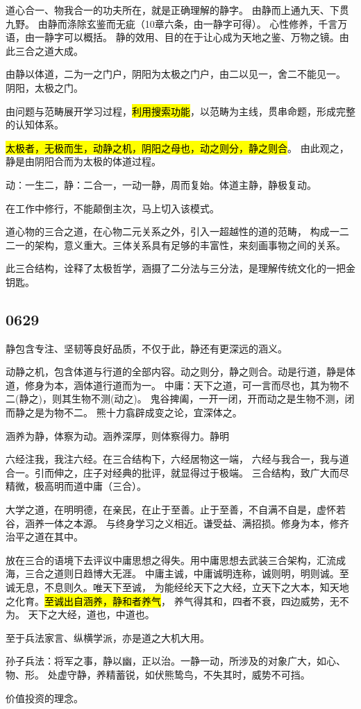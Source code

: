 道心合一、物我合一的功夫所在，就是正确理解的静字。
由静而上通九天、下贯九野。
由静而涤除玄鉴而无疵（10章六条，由一静字可得）。
心性修养，千言万语，由一静字可以概括。
静的效用、目的在于让心成为天地之鉴、万物之镜。由此三合之道大成。

由静以体道，二为一之门户，阴阳为太极之门户，由二以见一，舍二不能见一。
阴阳，太极之门。


由问题与范畴展开学习过程，\hl{利用搜索功能}，以范畴为主线，贯串命题，形成完整的认知体系。

\hl{太极者，无极而生，动静之机，阴阳之母也，动之则分，静之则合}。
由此观之，静是由阴阳合而为太极的体道过程。

动：一生二，静：二合一，一动一静，周而复始。体道主静，静极复动。

在工作中修行，不能颠倒主次，马上切入该模式。

道心物的三合之道，在心物二元关系之外，引入一超越性的道的范畴，
构成一二二一的架构，意义重大。三体关系具有足够的丰富性，来刻画事物之间的关系。

此三合结构，诠释了太极哲学，涵摄了二分法与三分法，是理解传统文化的一把金钥匙。

\subsection{0629}

静包含专注、坚韧等良好品质，不仅于此，静还有更深远的涵义。

动静之机，包含体道与行道的全部内容。动之则分，静之则合。动是行道，静是体道，修身为本，涵体道行道而为一。
中庸：天下之道，可一言而尽也，其为物不二(静之)，则其生物不测(动之)。
鬼谷捭阖，一开一闭，开而动之是生物不测，闭而静之是为物不二。
熊十力翕辟成变之论，宜深体之。

涵养为静，体察为动。涵养深厚，则体察得力。静明

六经注我，我注六经。在三合结构下，六经居物这一端，
六经与我合一，我与道合一。引而伸之，庄子对经典的批评，就显得过于极端。
三合结构，致广大而尽精微，极高明而道中庸（三合）。

大学之道，在明明德，在亲民，在止于至善。止于至善，不自满不自是，虚怀若谷，涵养一体之本源。
与终身学习之义相近。谦受益、满招损。修身为本，修齐治平之道在其中。

放在三合的语境下去评议中庸思想之得失。用中庸思想去武装三合架构，汇流成海，三合之道则日趋博大无涯。
中庸主诚，中庸诚明连称，诚则明，明则诚。至诚无息，不息则久。唯天下至诚，
为能经纶天下之大经，立天下之大本，知天地之化育。\hl{至诚出自涵养，静和者养气}，
养气得其和，四者不衰，四边威势，无不为。
天下之大经，道也，中道也。

至于兵法家言、纵横学派，亦是道之大机大用。

孙子兵法：将军之事，静以幽，正以治。一静一动，所涉及的对象广大，如心、物、形。
处虚守静，养精蓄锐，如伏熊鸷鸟，不失其时，威势不可挡。

价值投资的理念。
